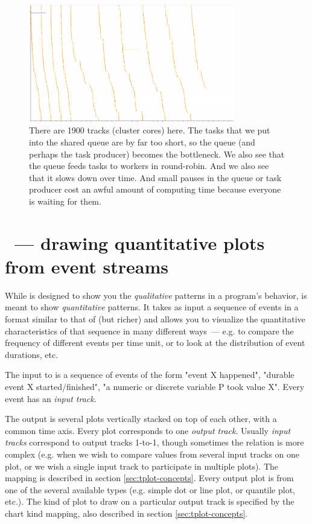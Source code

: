 \documentclass{article}
\begin{document}
\begin{figure}[p]
\center
\includegraphics[width=0.8\textwidth]{pics/splot/spray.png}
\caption{There are 1900 tracks (cluster cores) here. The tasks that we put into the shared queue are by far too short, so the queue (and perhaps the task producer) becomes the bottleneck. We also see that the queue feeds tasks to workers in round-robin. And we also see that it slows down over time. And small pauses in the queue or task producer cost an awful amount of computing time because everyone is waiting for them.}
\label{fig:splot-gallery-last}
\end{figure}

\pagebreak

\section{\timeplot{}~--- drawing quantitative plots from event streams}

While \splot{} is designed to show you the \emph{qualitative} patterns in a program's behavior, \timeplot{} is meant to show \emph{quantitative} patterns. It takes as input a sequence of events in a format similar to that of \splot{} (but richer) and allows you to visualize the quantitative characteristics of that sequence in many different ways~--- e.g. to compare the frequency of different events per time unit, or to look at the distribution of event durations, etc.

The input to \timeplot{} is a sequence of events of the form "event X happened", "durable event X started/finished", "a numeric or discrete variable P took value X". Every event has an \emph{input track}.

The output is several plots vertically stacked on top of each other, with a common time axis. Every plot corresponds to one \emph{output track}. Usually \emph{input tracks} correspond to output tracks 1-to-1, though sometimes the relation is more complex (e.g. when we wish to compare values from several input tracks on one plot, or we wish a single input track to participate in multiple plots). The mapping is described in section \ref{sec:tplot-concepts}. Every output plot is from one of the several available types (e.g. simple dot or line plot, or quantile plot, etc.). The kind of plot to draw on a particular output track is specified by the chart kind mapping, also described in section \ref{sec:tplot-concepts}.
\end{document}
